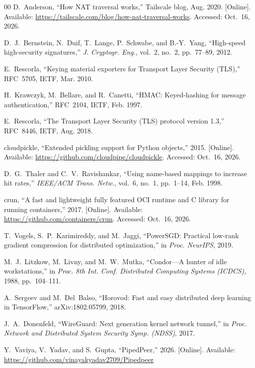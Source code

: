 \documentclass[conference]{IEEEtran}
\begin{document}
\begin{thebibliography}{00}
 D.~Anderson, ``How NAT traversal works,'' Tailscale blog, Aug. 2020. [Online]. Available: \url{https://tailscale.com/blog/how-nat-traversal-works}. Accessed: Oct.~16, 2026.

 D.~J.~Bernstein, N.~Duif, T.~Lange, P.~Schwabe, and B.-Y.~Yang, ``High-speed high-security signatures,'' \textit{J. Cryptogr. Eng.}, vol.~2, no.~2, pp.~77--89, 2012.

 E.~Rescorla, ``Keying material exporters for Transport Layer Security (TLS),'' RFC~5705, IETF, Mar. 2010.

 H.~Krawczyk, M.~Bellare, and R.~Canetti, ``HMAC: Keyed-hashing for message authentication,'' RFC~2104, IETF, Feb. 1997.

 E.~Rescorla, ``The Transport Layer Security (TLS) protocol version 1.3,'' RFC~8446, IETF, Aug. 2018.

 cloudpickle, ``Extended pickling support for Python objects,'' 2015. [Online]. Available: \url{https://github.com/cloudpipe/cloudpickle}. Accessed: Oct.~16, 2026.

 D.~G.~Thaler and C.~V.~Ravishankar, ``Using name-based mappings to increase hit rates,'' \textit{IEEE/ACM Trans. Netw.}, vol.~6, no.~1, pp.~1--14, Feb. 1998.

 crun, ``A fast and lightweight fully featured OCI runtime and C library for running containers,'' 2017. [Online]. Available: \url{https://github.com/containers/crun}. Accessed: Oct.~16, 2026.

 T.~Vogels, S.~P.~Karimireddy, and M.~Jaggi, ``PowerSGD: Practical low-rank gradient compression for distributed optimization,'' in \textit{Proc. NeurIPS}, 2019.

 M.~J.~Litzkow, M.~Livny, and M.~W.~Mutka, ``Condor---A hunter of idle workstations,'' in \textit{Proc. 8th Int. Conf. Distributed Computing Systems (ICDCS)}, 1988, pp.~104--111.


 A.~Sergeev and M.~Del~Balso, ``Horovod: Fast and easy distributed deep learning in TensorFlow,'' arXiv:1802.05799, 2018.

 J.~A.~Donenfeld, ``WireGuard: Next generation kernel network tunnel,'' in \textit{Proc. Network and Distributed System Security Symp. (NDSS)}, 2017.


 Y.~Vaviya, V.~Yadav, and S.~Gupta, ``PipedPeer,'' 2026. [Online]. Available: \url{https://github.com/vinayakyadav2709/Pipedpeer}

\end{thebibliography}
\end{document}
